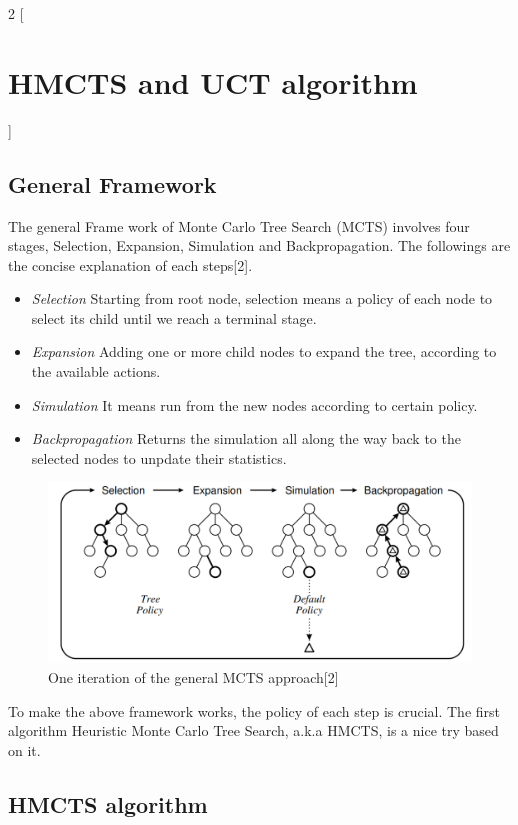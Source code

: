 \documentclass[a4paper, 11pt]{article} %
\begin{document}
	
	\begin{multicols}{2}
		[\section{HMCTS and UCT algorithm}]
		
		\subsection{General Framework}
		
		The general Frame work of Monte Carlo Tree Search (MCTS) involves four stages, Selection, Expansion, Simulation and Backpropagation. The followings are the concise explanation of each steps[2].
		
		\begin{itemize}
			\item \textit{Selection} Starting from root node, selection means a policy of each node to select its child until we reach a terminal stage.
			\item \textit{Expansion} Adding one or more child nodes to expand the tree, according to the available actions.
			\item \textit{Simulation} It means run from the new nodes according to certain policy.
			\item \textit{Backpropagation} Returns the simulation all along the way back to the selected nodes to unpdate their statistics.
		\end{itemize}
		\begin{figure}[H]
			\centering
			\includegraphics[scale = 0.3]{MCTS stages.png}
			\caption{One iteration of the general MCTS approach[2]}
		\end{figure}
	
		To make the above framework works, the policy of each step is crucial. The first algorithm Heuristic Monte Carlo Tree Search, a.k.a HMCTS, is a nice try based on it.
		
		\subsection{HMCTS algorithm}
		

\end{multicols}
\end{document}
